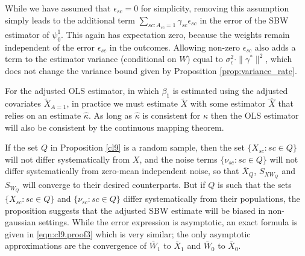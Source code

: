 \begin{remark}
    While we have assumed that $\epsilon_{sc}=0$ for simplicity, removing this assumption simply leads to the additional term $\sum_{sc: A_{sc} = 1}\gamma_{sc}\epsilon_{sc}$ in the error of the SBW estimator of $\psi_0^1$. This again has expectation zero, because the weights remain independent of the error $\epsilon_{sc}$ in the outcomes. Allowing non-zero $\epsilon_{sc}$ also adds a term to the estimator variance (conditional on $W$) equal to $\sigma^2_{\epsilon}\cdot \|\gamma^*\|^2$,    which does not change the variance bound given by Proposition \ref{prop:variance_rate}.
\end{remark}




\begin{remark}
    For the adjusted OLS estimator, in which $\beta_1$ is estimated using the adjusted covariates $\tilde{X}_{A=1}$, in practice we must estimate $\tilde{X}$ with some estimator $\hat{X}$ that relies on an estimate $\hat{\kappa}$. As long as $\hat{\kappa}$ is consistent for $\kappa$ then the OLS estimator will also be consistent by the continuous mapping theorem.
\end{remark}

\begin{remark}
If the set $Q$ in Proposition \ref{cl9} is a random sample, then the set $\{X_{sc}:sc \in Q\}$ will not differ systematically from $X$, and the noise terms $\{\nu_{sc}:sc \in Q\}$ will not differ systematically from zero-mean independent noise, so that $\bar{X}_Q$, $S_{XW_Q}$ and $S_{W_Q}$ will converge to their desired counterparts. But if $Q$ is such that the sets $\{X_{sc}: sc \in Q\}$ and $\{\nu_{sc}: sc \in Q\}$ differ systematically from their populations, the proposition suggests that the adjusted SBW estimate will be biased in non-gaussian settings. While the error expression is asymptotic, an exact formula is given in  \eqref{eqn:cl9.proof3} which is very similar; the only asymptotic approximations are the convergence of $\bar{W}_1$ to $\bar{X}_1$ and $\bar{W}_0$ to $\bar{X}_0$.
\end{remark}



